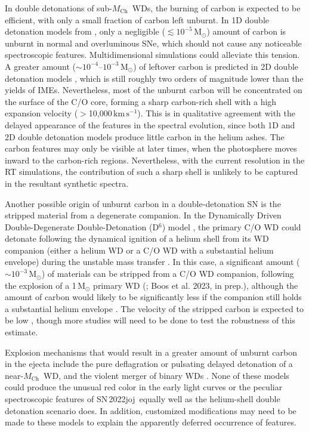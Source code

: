 \documentclass[twocolumn]{aastex631}
\newcommand{\sn}{SN\,2022joj}
\newcommand{\Mch}{$M_\mathrm{Ch}$}
\newcommand{\kms}{$\mathrm{km}\,\mathrm{s}^{-1}$}
\begin{document}
\begin{CJK*}{UTF8}{gbsn}
In double detonations of sub-\Mch\ WDs, the burning of carbon is expected to be efficient, with only a small fraction of carbon left unburnt. In 1D double detonation models from \citet{polin_observational_2019}, only a negligible ($\lesssim$$10^{-5}\,\mathrm{M_\odot}$) amount of carbon is unburnt in normal and overluminous SNe, which should not cause any noticeable spectroscopic features. Multidimensional simulations could alleviate this tension. A greater amount ($\sim$$10^{-4}$--$10^{-3}$\,$\mathrm{M_\odot}$) of leftover carbon is predicted in 2D double detonation models \citep{Fink_DD_2010,Boos_2021}, which is still roughly two orders of magnitude lower than the yields of IMEs. Nevertheless, most of the unburnt carbon will be concentrated on the surface of the C/O core, forming a sharp carbon-rich shell \citep[see Figure~5--8 in][]{Boos_2021} with a high expansion velocity ($>$10,000\,\kms). This is in qualitative agreement with the delayed appearance of the  features in the spectral evolution, since both 1D and 2D double detonation models produce little carbon in the helium ashes. The carbon features may only be visible at later times, when the photosphere moves inward to the carbon-rich regions. Nevertheless, with the current resolution in the RT simulations, the contribution of such a sharp shell is unlikely to be captured in the resultant synthetic spectra. 

Another possible origin of unburnt carbon in a double-detonation SN is the stripped material from a degenerate companion. In the Dynamically Driven Double-Degenerate Double-Detonation (D$^6$) model \citep{Shen_2018}, the primary C/O WD could detonate following the dynamical ignition of a helium shell from its WD companion (either a helium WD or a C/O WD with a substantial helium envelope) during the unstable mass transfer \citep{Guillochon_2010,Pakmor_2013}. In this case, a significant amount ($\sim$$10^{-3}\,\mathrm{M_\odot}$) of materials can be stripped from a C/O WD companion, following the explosion of a 1\,$\mathrm{M_\odot}$ primary WD (\citealp{Tanikawa_2018}; Boos et al. 2023, in prep.), although the amount of carbon would likely to be significantly less if the companion still holds a substantial helium envelope \citep{Tanikawa_2019}. The velocity of the stripped carbon is expected to be low \citep[e.g., centered at $\sim$3000\,\kms\ in][]{Tanikawa_2018}, though more studies will need to be done to test the robustness of this estimate.

Explosion mechanisms that would result in a greater amount of unburnt carbon in the ejecta include the pure deflagration \citep{Nomoto_1984b} or pulsating delayed detonation \citep{Hoeflich_1995,Dessart_2014} of a near-\Mch\ WD, and the violent merger of binary WDs \citep{Raskin_2014}. None of these models could produce the unusual red color in the early light curves or the peculiar spectroscopic features of \sn\ equally well as the helium-shell double detonation scenario does. In addition, customized modifications may need to be made to these models to explain the apparently deferred occurrence of  features.


\end{CJK*}
\end{document}
